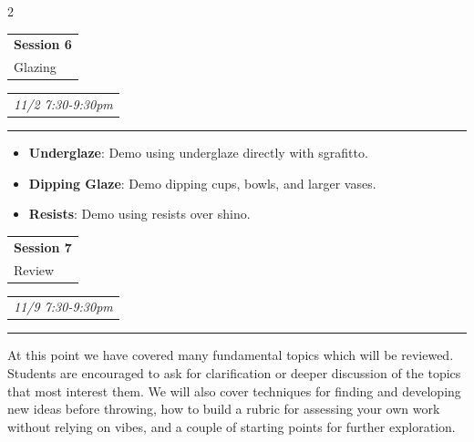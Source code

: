 \documentclass[9pt]{extarticle}
\makeatletter
\newcommand{\split}[3]{
\noindent\begin{tabular}[t]{@{}l}
    \textbf{#1} \\ #2
\end{tabular}
\hfill
\begin{tabular}[t]{l@{}}
    \\
    \textit{#3}
\end{tabular}
\noindent\rule{\columnwidth}{0.5pt}
}
\makeatother
\begin{document}
\begin{multicols}{2}
	\split{Session 6}{Glazing}{11/2 7:30-9:30pm}
	\begin{itemize}
		\item \textbf{Underglaze}: Demo using underglaze directly with sgrafitto.
		\item \textbf{Dipping Glaze}: Demo dipping cups, bowls, and larger vases.
		\item \textbf{Resists}: Demo using resists over shino.
	\end{itemize}

	\split{Session 7}{Review}{11/9 7:30-9:30pm}
	At this point we have covered many fundamental topics which will be reviewed.
	Students are encouraged to ask for clarification or deeper discussion of the
	topics that most interest them. We will also cover techniques for finding and
	developing new ideas before throwing, how to build a rubric for assessing your
	own work without relying on vibes, and a couple of starting points for further
	exploration.


\end{multicols}
\end{document}
